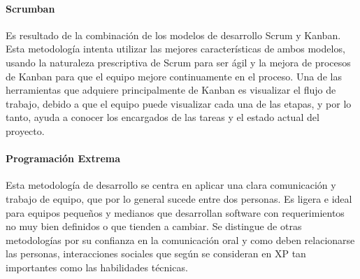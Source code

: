 \paragraph{Scrumban} Es resultado de la combinación de los modelos de desarrollo Scrum y Kanban. Esta metodología intenta utilizar las mejores características de ambos modelos, usando la naturaleza prescriptiva de Scrum para ser ágil y la mejora de procesos de Kanban para que el equipo mejore continuamente en el proceso. Una de las herramientas que adquiere principalmente de Kanban es visualizar el flujo de trabajo, debido a que el equipo puede visualizar cada una de las etapas, y por lo tanto, ayuda a conocer los encargados de las tareas y el estado actual del proyecto.

\paragraph{Programación Extrema} Esta metodología de desarrollo se centra en aplicar una clara comunicación y trabajo de equipo, que por lo general sucede entre dos personas. Es ligera e ideal para equipos pequeños y medianos que desarrollan software con requerimientos no muy bien definidos o que tienden a cambiar. Se distingue de otras metodologías por su confianza en la comunicación oral y como deben relacionarse las personas, interacciones sociales que según \textcite{Beck2004} se consideran en XP tan importantes como las habilidades técnicas.


